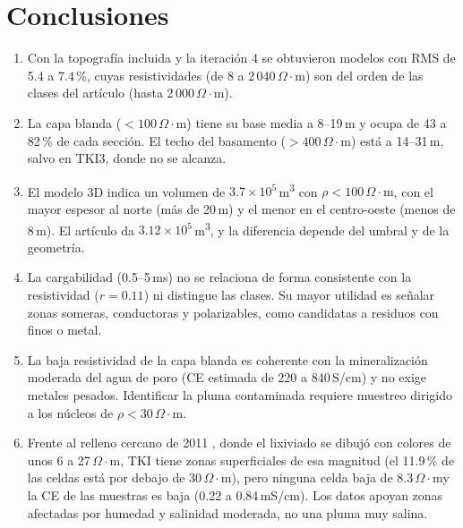 \documentclass[conference]{IEEEtran}
\newcommand{\ohmm}{\ensuremath{\Omega\!\cdot\!\mathrm{m}}}
\newcommand{\mcub}{m\textsuperscript{3}}
\begin{document}
\section{Conclusiones}
\begin{enumerate}
\item Con la topografía incluida y la iteración 4 se obtuvieron modelos con RMS de 5.4 a 7.4\,\%, cuyas resistividades (de 8 a 2\,040\,\ohmm) son del orden de las clases del artículo (hasta 2\,000\,\ohmm).
\item La capa blanda ($<100$\,\ohmm) tiene su base media a 8--19\,m y ocupa de 43 a 82\,\% de cada sección. El techo del basamento ($>400$\,\ohmm) está a 14--31\,m, salvo en TKI3, donde no se alcanza.
\item El modelo 3D indica un volumen de $3.7\times10^{5}$\,\mcub{} con $\rho<100$\,\ohmm, con el mayor espesor al norte (más de 20\,m) y el menor en el centro-oeste (menos de 8\,m). El artículo da $3.12\times10^{5}$\,\mcub, y la diferencia depende del umbral y de la geometría.
\item La cargabilidad (0.5--5\,ms) no se relaciona de forma consistente con la resistividad ($r=0.11$) ni distingue las clases. Su mayor utilidad es señalar zonas someras, conductoras y polarizables, como candidatas a residuos con finos o metal.
\item La baja resistividad de la capa blanda es coherente con la mineralización moderada del agua de poro (CE estimada de 220 a 840\,\textmu S/cm) y no exige metales pesados. Identificar la pluma contaminada requiere muestreo dirigido a los núcleos de $\rho<30$\,\ohmm.
\item Frente al relleno cercano de 2011 \cite{umor2011}, donde el lixiviado se dibujó con colores de unos 6 a 27\,\ohmm, TKI tiene zonas superficiales de esa magnitud (el 11.9\,\% de las celdas está por debajo de 30\,\ohmm), pero ninguna celda baja de 8.3\,\ohmm y la CE de las muestras es baja (0.22 a 0.84\,mS/cm). Los datos apoyan zonas afectadas por humedad y salinidad moderada, no una pluma muy salina.
\end{enumerate}
\end{document}
